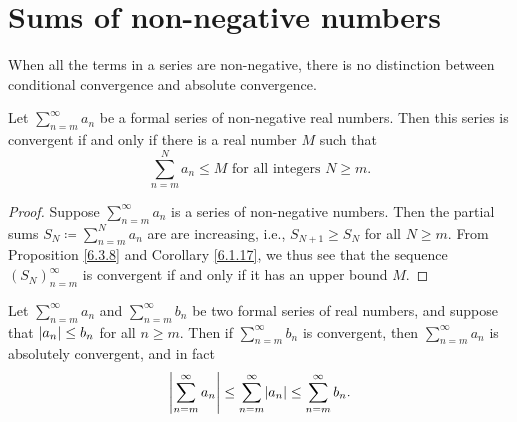\section{Sums of non-negative numbers}\label{sec 7.3}

\begin{note}
When all the terms in a series are non-negative, there is no distinction between conditional convergence and absolute convergence.
\end{note}

\begin{proposition}\label{7.3.1}
Let \(\sum_{n = m}^\infty a_n\) be a formal series of non-negative real numbers.
Then this series is convergent if and only if there is a real number \(M\) such that
\[
    \sum_{n = m}^N a_n \leq M \text{ for all integers } N \geq m.
\]
\end{proposition}

\begin{proof}
Suppose \(\sum_{n = m}^\infty a_n\) is a series of non-negative numbers.
Then the partial sums \(S_N \coloneqq \sum_{n = m}^N a_n\) are are increasing, i.e., \(S_{N + 1} \geq S_N\) for all \(N \geq m\).
From Proposition \ref{6.3.8} and Corollary \ref{6.1.17}, we thus see that the sequence \((S_N)_{n = m}^\infty\) is convergent if and only if it has an upper bound \(M\).
\end{proof}

\begin{corollary}\label{7.3.2}
Let \(\sum_{n = m}^\infty a_n\) and \(\sum_{n = m}^\infty b_n\) be two formal series of real numbers, and suppose that \(\abs*{a_n} \leq b_n\) for all \(n \geq m\).
Then if \(\sum_{n = m}^\infty b_n\) is convergent, then \(\sum_{n = m}^\infty a_n\) is absolutely convergent, and in fact
\[
    \abs*{\sum_{n = m}^\infty a_n} \leq \sum_{n = m}^\infty \abs*{a_n} \leq \sum_{n = m}^\infty b_n.
\]
\end{corollary}

